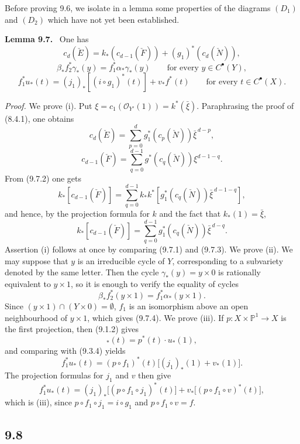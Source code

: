 \documentclass[11pt]{article}
\newenvironment{statement}[1]{\par\medskip\noindent\textbf{#1.}\ }{\par\medskip}
\begin{document}
Before proving 9.6, we isolate in a lemma some properties of the diagrams $(D_1)$ and $(D_2)$ which have not yet been established.

\begin{statement}{Lemma 9.7}
One has
\[
c_d(\check E)=k_*(c_{d-1}(\check F))+(g_1)^*(c_d(\check N)),
\tag{9.7 i}
\]
\[
\beta_*f_2^*\gamma_*(y)=f_1^*\alpha_*\gamma_*(y)\qquad\text{for every }y\in C^{\bullet}(Y),
\tag{9.7 ii}
\]
\[
f_1^*u_*(t)=(j_1)_*[(i\circ g_1)^*(t)]+v_*f^*(t)\qquad\text{for every }t\in C^{\bullet}(X).
\tag{9.7 iii}
\]
\end{statement}

\emph{Proof.} We prove (i). Put $\xi=c_1(\mathcal O_{Y'}(1))=k^*(\bar\xi)$. Paraphrasing the proof of (8.4.1), one obtains
\[
c_d(\check E)=\sum_{p=0}^d g_1^*(c_p(\check N))\bar\xi^{\,d-p},
\tag{9.7.1}
\]
\[
c_{d-1}(\check F)=\sum_{q=0}^{d-1}g^*(c_q(\check N))\xi^{d-1-q}.
\tag{9.7.2}
\]
From (9.7.2) one gets
\[
k_*[c_{d-1}(\check F)]
=\sum_{q=0}^{d-1}k_*k^*[g_1^*(c_q(\check N))\bar\xi^{\,d-1-q}],
\]
and hence, by the projection formula for $k$ and the fact that $k_*(1)=\bar\xi$,
\[
k_*[c_{d-1}(\check F)]=\sum_{q=0}^{d-1}g_1^*(c_q(\check N))\bar\xi^{\,d-q}.
\tag{9.7.3}
\]
Assertion (i) follows at once by comparing (9.7.1) and (9.7.3). We prove (ii). We may suppose that $y$ is an irreducible cycle of $Y$, corresponding to a subvariety denoted by the same letter. Then the cycle $\gamma_*(y)=y\times0$ is rationally equivalent to $y\times1$, so it is enough to verify the equality of cycles
\[
\beta_*f_2^*(y\times1)=f_1^*\alpha_*(y\times1).
\tag{9.7.4}
\]
Since $(y\times1)\cap(Y\times0)=\emptyset$, $f_1$ is an isomorphism above an open neighbourhood of $y\times1$, which gives (9.7.4). We prove (iii). If $p:X\times\mathbb P^1\to X$ is the first projection, then (9.1.2) gives
\[
_*(t)=p^*(t)\cdot u_*(1),
\tag{9.7.5}
\]
and comparing with (9.3.4) yields
\[
f_1^*u_*(t)=(p\circ f_1)^*(t)\bigl[(j_1)_*(1)+v_*(1)\bigr].
\tag{9.7.6}
\]
The projection formulas for $j_1$ and $v$ then give
\[
f_1^*u_*(t)=(j_1)_*\bigl[(p\circ f_1\circ j_1)^*(t)\bigr]+v_*\bigl[(p\circ f_1\circ v)^*(t)\bigr],
\tag{9.7.7}
\]
which is (iii), since $p\circ f_1\circ j_1=i\circ g_1$ and $p\circ f_1\circ v=f$.

\subsection*{9.8}
\end{document}
